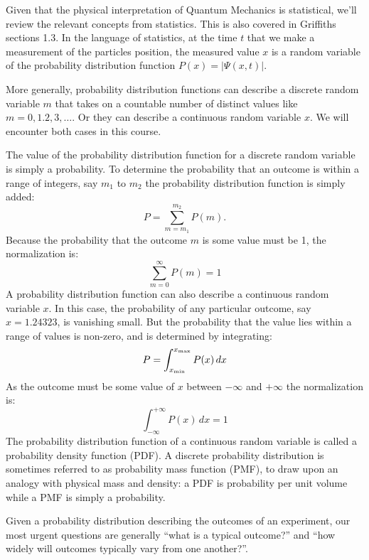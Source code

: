 \documentclass[12pt]{book}
\begin{document}
Given that the physical interpretation of Quantum Mechanics is statistical, we'll review the relevant concepts from statistics. This is also covered in Griffiths sections 1.3.  In the language of statistics, at the time $t$ that we make a measurement of the particles position, the measured value $x$ is a random variable of the probability distribution function $P(x) = |\Psi(x,t)|$. 

More generally, probability distribution functions can describe a discrete random variable $m$ 
that takes on a countable number of distinct values like $m=0,1.2,3,\ldots$.   Or they can describe a continuous random variable $x$.  We will encounter both cases in this course.

The value of the probability distribution function for a discrete random variable is simply a probability.  To determine the probability that an outcome is within a range of integers, say $m_1$
to $m_2$ the probability distribution function is simply added:
\begin{displaymath}
P = \sum_{m=m_1}^{m_2} P(m).
\end{displaymath}
Because the probability that the outcome $m$ is some value must be 1, the normalization is:
\begin{displaymath}
\sum_{m=0}^{\infty} P(m) = 1
\end{displaymath}
A probability distribution function can also describe a continuous random variable $x$.  In this case, the probability of any particular outcome, say $x=1.24323$, is vanishing small.  But the
probability that the value lies within a range of values is non-zero,
and is determined by integrating:
\begin{displaymath}
P = \int_{x_{\rm min}}^{x_{\rm max}} P(x) \, dx
\end{displaymath}
As the outcome must be some value of $x$ between $-\infty$ and $+\infty$ the normalization is:
\begin{displaymath}
\int_{-\infty}^{+\infty} P(x) \, dx = 1
\end{displaymath}
The probability distribution function of a continuous random variable is called a probability density function (PDF).  A discrete probability distribution is sometimes referred to
as probability mass function (PMF), to draw upon an analogy with
physical mass and density: a PDF is probability per unit volume while
a PMF is simply a probability.

Given a probability distribution describing the outcomes of an
experiment, our most urgent questions are generally ``what is a
typical outcome?'' and ``how widely will outcomes typically vary from
one another?''.
\end{document}
